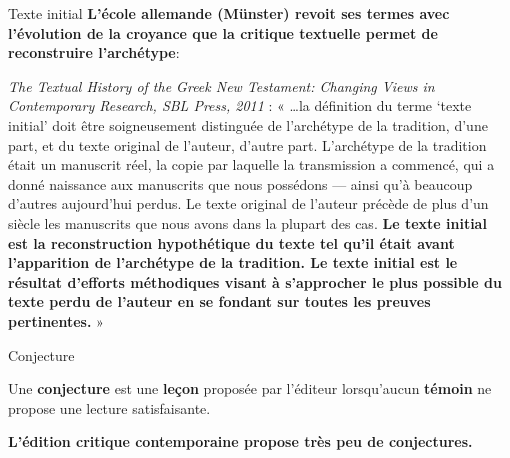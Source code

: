 \documentclass[11pt]{beamer}
\begin{document}
\begin{frame}{Texte initial}
\textbf{L'école allemande (Münster) revoit ses termes avec l'évolution de la croyance que la critique textuelle permet de reconstruire l'archétype}:

\begin{exampleblock}{}
\footnotesize
\emph{The Textual History of the Greek New Testament: Changing Views in Contemporary Research, SBL Press, 2011} :
    « …la définition du terme ‘texte initial’ doit être soigneusement distinguée de l’archétype de la tradition, d'une part, et du texte original de l’auteur, d'autre part. L’archétype de la tradition était un manuscrit réel, la copie par laquelle la transmission a commencé, qui a donné naissance aux manuscrits que nous possédons — ainsi qu’à beaucoup d’autres aujourd’hui perdus. Le texte original de l’auteur précède de plus d’un siècle les manuscrits que nous avons dans la plupart des cas. \textbf{Le texte initial est la reconstruction hypothétique du texte tel qu’il était avant l’apparition de l’archétype de la tradition. Le texte initial est le résultat d’efforts méthodiques visant à s’approcher le plus possible du texte perdu de l’auteur en se fondant sur toutes les preuves pertinentes.} »  
\end{exampleblock}
\end{frame}

\begin{frame}{Conjecture}

\begin{alertblock}{}
    Une \textbf{conjecture} est une \textbf{leçon} proposée par l'éditeur lorsqu'aucun \textbf{témoin} ne propose une lecture satisfaisante.
\end{alertblock}

\textbf{L'édition critique contemporaine propose très peu de conjectures.}

\end{frame}
\end{document}
